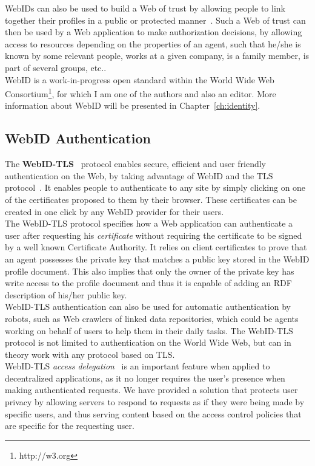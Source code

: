 WebIDs can also be used to build a Web of trust by allowing people to link together their profiles in a public or protected manner~\cite{sambra2011friending}. Such a Web of trust can then be used by a Web application to make authorization decisions, by allowing access to resources depending on the properties of an agent, such that he/she is known by some relevant people, works at a given company, is a family member, is part of several groups, etc..\\

WebID is a work-in-progress open standard within the World Wide Web Consortium\footnote{http://w3.org}, for which I am one of the authors and also an editor. More information about WebID will be presented in Chapter~\ref{ch:identity}.

\subsection{WebID Authentication}
The \textbf{WebID-TLS}~\cite{webid-tls} protocol enables secure, efficient and user friendly authentication on the Web, by taking advantage of WebID and the TLS protocol~\cite{allen1999tls}. It enables people to authenticate to any site by simply clicking on one of the certificates proposed to them by their browser. These certificates can be created in one click by any WebID provider for their users.\\

The WebID-TLS protocol specifies how a Web application can authenticate a user after requesting his \textit{certificate} without requiring the certificate to be signed by a well known Certificate Authority. It relies on client certificates to prove that an agent possesses the private key that matches a public key stored in the WebID profile document. This also implies that only the owner of the private key has write access to the profile document and thus it is capable of adding an RDF description of his/her public key.\\

WebID-TLS authentication can also be used for automatic authentication by robots, such as Web crawlers of linked data repositories, which could be agents working on behalf of users to help them in their daily tasks. The WebID-TLS protocol is not limited to authentication on the World Wide Web, but can in theory work with any protocol based on TLS.\\

WebID-TLS \textit{access delegation}~\cite{tramp2012extending} is an important feature when applied to decentralized applications, as it no longer requires the user's presence when making authenticated requests. We have provided a solution that protects user privacy by allowing servers to respond to requests as if they were being made by specific users, and thus serving content based on the access control policies that are specific for the requesting user.

